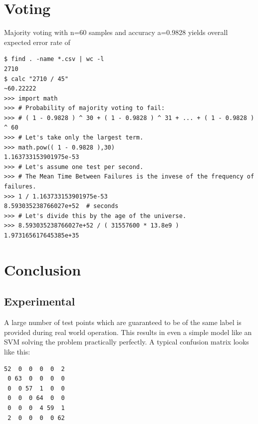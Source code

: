 \documentclass{article}
\begin{document}
\section{Voting}
Majority voting with n=60 samples and accuracy a=0.9828 yields overall expected error rate of
\begin{verbatim}
$ find . -name *.csv | wc -l
2710
$ calc "2710 / 45"
~60.22222
>>> import math
>>> # Probability of majority voting to fail:
>>> # ( 1 - 0.9828 ) ^ 30 + ( 1 - 0.9828 ) ^ 31 + ... + ( 1 - 0.9828 ) ^ 60
>>> # Let's take only the largest term.
>>> math.pow(( 1 - 0.9828 ),30)
1.163733153901975e-53
>>> # Let's assume one test per second.
>>> # The Mean Time Between Failures is the invese of the frequency of failures.
>>> 1 / 1.163733153901975e-53
8.593035238766027e+52  # seconds
>>> # Let's divide this by the age of the universe.
>>> 8.593035238766027e+52 / ( 31557600 * 13.8e9 )
1.973165617645385e+35
\end{verbatim}


\section{Conclusion}
\subsection{Experimental}
A large number of test points which are guaranteed to be of the same label is provided during real world operation.
This results in even a simple model like an SVM solving the problem practically perfectly.
A typical confusion matrix looks like this:
\begin{verbatim}
52  0  0  0  0  2
 0 63  0  0  0  0
 0  0 57  1  0  0
 0  0  0 64  0  0
 0  0  0  4 59  1
 2  0  0  0  0 62
\end{verbatim}
\end{document}

